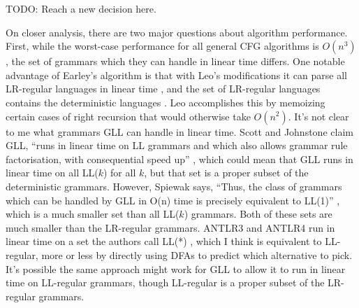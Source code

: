 \documentclass[12pt]{article}
\begin{document}
TODO: Reach a new decision here.

On closer analysis, there are two major questions about algorithm
performance.  First, while the worst-case performance for all general
CFG algorithms is $O(n^3)$, the set of grammars which they can handle
in linear time differs.  One notable advantage of Earley's algorithm
is that with Leo's modifications it can parse all LR-regular languages
in linear time \parencites{leo, marpa}, and the set of LR-regular
languages contains the deterministic languages \parencite{lr-regular}.
Leo accomplishes this by memoizing certain cases of right recursion
that would otherwise take $O(n^2)$.  It's not clear to me what
grammars GLL can handle in linear time.  Scott and Johnstone claim
GLL, ``runs in linear time on LL grammars and which also allows
grammar rule factorisation, with consequential speed
up'' \parencite{gll1}, which could mean that GLL runs in linear time
on all LL($k$) for all $k$, but that set is a proper subset of the
deterministic grammars.  However, Spiewak says, ``Thus, the class of
grammars which can be handled by GLL in O(n) time is precisely
equivalent to LL(1)'' \parencite{spiewak}, which is a much smaller set
than all LL($k$) grammars.  Both of these sets are much smaller than
the LR-regular grammars.  ANTLR3 and ANTLR4 run in linear time on a
set the authors call LL(*) \parencites{antlr3, antlr4}, which I think
is equivalent to LL-regular, more or less by directly using DFAs to
predict which alternative to pick.  It's possible the same approach
might work for GLL to allow it to run in linear time on LL-regular
grammars, though LL-regular is a proper subset of the LR-regular
grammars\parencite{ll-regular}.
\end{document}
